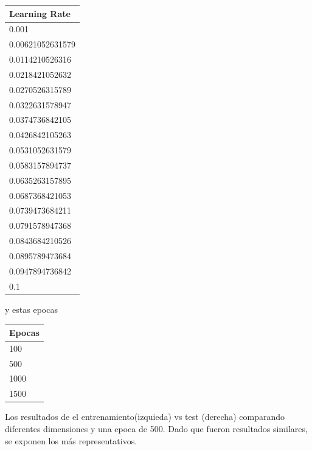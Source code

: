 \begin{tabular}{|l|}
\hline
Learning Rate \\ \hline
0.001              \\ \hline
0.00621052631579 \\ \hline
0.0114210526316 \\ \hline
0.0218421052632 \\ \hline
0.0270526315789 \\ \hline
0.0322631578947	 \\ \hline
0.0374736842105	 \\ \hline
0.0426842105263	 \\ \hline
0.0531052631579	 \\ \hline
0.0583157894737	 \\ \hline
0.0635263157895	 \\ \hline
0.0687368421053	 \\ \hline
0.0739473684211	 \\ \hline
0.0791578947368	 \\ \hline
0.0843684210526	 \\ \hline
0.0895789473684	 \\ \hline
0.0947894736842	 \\ \hline
0.1 \\ \hline

\end{tabular}
y estas epocas
\begin{tabular}{|l|}
\hline
Epocas\\ \hline
100 \\ \hline
500 \\ \hline
1000 \\ \hline
1500 \\ \hline
\end{tabular}

Los resultados de el entrenamiento(izquieda) vs test (derecha) comparando diferentes dimensiones y una epoca de 500. Dado que fueron resultados similares, se exponen los m\'as representativos.

